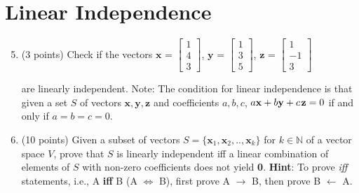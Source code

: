 \documentclass{article}%
\begin{document}
\section*{Linear Independence}
\begin{enumerate}
  \setcounter{enumi}{4}
    \item  (3 points) Check if the vectors $\mathbf{x}$ = $\begin{bmatrix} 
    1 \\ 4 \\ 3 \end{bmatrix}$, $\mathbf{y}$ = $\begin{bmatrix} 
    1 \\ 3 \\ 5 \end{bmatrix}$, $\mathbf{z}$ = $\begin{bmatrix} 
    1 \\ -1 \\ 3 \end{bmatrix}$
    
    are linearly independent. 
    Note: The condition for linear independence is that given a set $S$ of vectors $\mathbf{x},\mathbf{y},\mathbf{z}$ and coefficients $a, b, c$, $a \mathbf{x} + b \mathbf{y} + c \hspace{0.25ex}\mathbf{z} = 0$ if and only if $a = b = c = 0$.\vspace{2ex}


    
    \item (10 points) Given a subset of vectors $S = \{\mathbf{x}_1,\mathbf{x}_2,..,\mathbf{x}_k\}$ for $k \in \mathbb{N}$ of a vector space $V$, prove that $S$ is linearly independent iff a linear combination of elements of $S$ with non-zero coefficients does not yield \textbf{0}. \textbf{Hint}: To prove \textit{iff} statements, i.e., A \textbf{iff} B (A $\iff$ B), first prove A $\rightarrow$ B, then prove B $\leftarrow$ A.


\end{enumerate}
\end{document}
